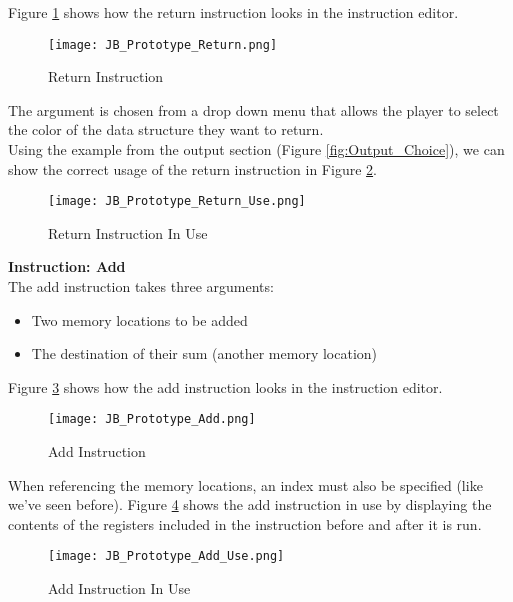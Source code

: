 Figure \ref{fig:Return_Instruction} shows how the return instruction looks in the instruction editor.

\begin{figure}[!hb]
  \caption{Return Instruction}
  \label{fig:Return_Instruction}
  \centering
  \texttt{[image: JB\_Prototype\_Return.png]}
\end{figure}

The argument is chosen from a drop down menu that allows the player to select
the color of the data structure they want to return.\\

Using the example from the output section (Figure \ref{fig:Output_Choice}),
we can show the correct usage of the return instruction in Figure \ref{fig:Return_Instruction_Use}.

\begin{figure}[!hb]
  \caption{Return Instruction In Use}
  \label{fig:Return_Instruction_Use}
  \centering
  \texttt{[image: JB\_Prototype\_Return\_Use.png]}
\end{figure}
\vfill
\clearpage

\textbf{Instruction: Add}\\

The add instruction takes three arguments:
\begin{itemize}
  \item Two memory locations to be added
  \item The destination of their sum (another memory location)
\end{itemize}

Figure \ref{fig:Add_Instruction} shows how the add instruction looks in the
instruction editor.

\begin{figure}[!hb]
  \caption{Add Instruction}
  \label{fig:Add_Instruction}
  \centering
  \texttt{[image: JB\_Prototype\_Add.png]}
\end{figure}

When referencing the memory locations, an index must also be specified (like we've
seen before). Figure \ref{fig:Add_Instruction_Use} shows the add instruction in use by displaying
the contents of the registers included in the instruction before and after it is
run.

\begin{figure}[!hb]
  \caption{Add Instruction In Use}
  \label{fig:Add_Instruction_Use}
  \centering
  \texttt{[image: JB\_Prototype\_Add\_Use.png]}
\end{figure}

